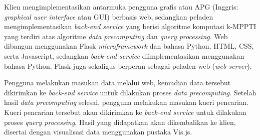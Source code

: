Klien mengimplementasikan antarmuka pengguna grafis atau APG (Inggris: \textit{graphical user interface} atau GUI) berbasis web, sedangkan peladen mengimplementasikan \textit{back-end service} yang berisi algoritme komputasi k-MPPTI yang terdiri atas algoritme \textit{data precomputing} dan \textit{query processing}. Web dibangun menggunakan Flask \textit{microframework} dan bahasa Python, HTML, CSS, serta Javascript, sedangkan \textit{back-end service} diimplementasikan menggunakan bahasa Python. Flask juga sekaligus berperan sebagai peladen web (\textit{web server}).

Pengguna melakukan masukan data melalui web, kemudian data tersebut dikirimkan ke \textit{back-end service} untuk dilakukan proses \textit{data precomputing}. Setelah hasil \textit{data precomputing} selesai, pengguna melakukan masukan kueri pencarian. Kueri pencarian tersebut akan dikirimkan ke \textit{back-end service} untuk dilakukan proses \textit{query processing}. Hasil yang didapatkan akan dikembalikan ke klien, disertai dengan visualisasi data menggunakan pustaka Vis.js.
